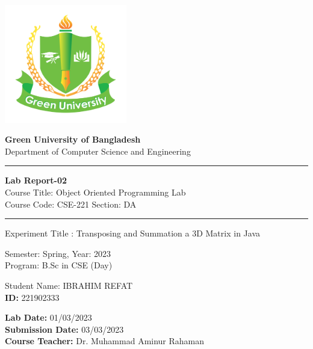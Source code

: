 \documentclass{article}
\begin{document}
\begin{titlepage}
  \begin{center}
  
    
    \includegraphics[width=0.4\textwidth]{logo.svg.png}
    
    {\LARGE\textbf{Green University of Bangladesh}}\\
    \vspace{0.5cm}
    {\Large Department of Computer Science and Engineering}\\
    \vspace{1cm}
    
    \rule{\linewidth}{0.5mm}
    
    \vspace{0.5cm}
    {\LARGE\textbf{Lab Report-02}}\\
    \vspace{0.5cm}
    {\Large Course Title: Object Oriented Programming Lab}\\
    \vspace{0.2cm}
    {\Large Course Code: CSE-221 Section: DA}\\
    \vspace{0.5cm}
   \rule{\linewidth}{0.5mm}
 
    \LARGE \textbf{} Experiment Title : Transposing and Summation a 3D Matrix in Java  \newline
   
     \LARGE \textbf{} Semester: \LARGE Spring, Year: 2023\\
    \vspace{0.5cm}
    \LARGE \textbf{} Program: B.Sc in CSE (Day)\\
    
    \vspace{3cm}
    \begin{tcolorbox}[colback=white,colframe=black,width=10cm,height=2cm]
      \LARGE{Student Name:} IBRAHIM REFAT \\
      \textbf{ID:} 221902333 \\
    \end{tcolorbox}
    
    \vspace{2cm}
    \textbf{Lab Date:} 01/03/2023 \\
    \vspace{0.2cm}
  \textbf{Submission Date:} 03/03/2023 \\
    \vspace{0.2cm}
   \textbf{Course Teacher:} Dr. Muhammad Aminur Rahaman
    
  \end{center}
\end{titlepage}
\end{document}
